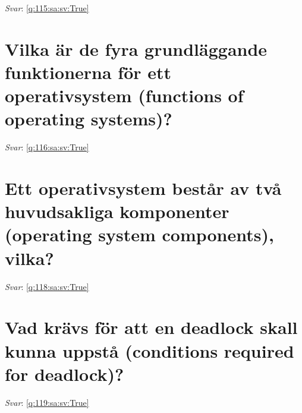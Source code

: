 \documentclass[a4paper,11pt,oneside]{book}
\begin{document}
\begin{sloppypar}
\vspace{2cm}

\noindent\makebox[\textwidth]{\hrulefill}

\vspace{1cm}

\textit{Svar}: \autoref{q:115:sa:sv:True}



\section{Vilka \"ar de fyra grundl\"aggande funktionerna f\"or ett operativsystem (functions of operating systems)?}

\label{q:116:sa:sv:False}

\vspace{2cm}

\noindent\makebox[\textwidth]{\hrulefill}

\vspace{1cm}

\textit{Svar}: \autoref{q:116:sa:sv:True}



\section{Ett operativsystem best\r{a}r av tv\r{a} huvudsakliga komponenter (operating system components), vilka?}

\label{q:118:sa:sv:False}

\vspace{2cm}

\noindent\makebox[\textwidth]{\hrulefill}

\vspace{1cm}

\textit{Svar}: \autoref{q:118:sa:sv:True}



\section{Vad kr\"avs f\"or att en deadlock skall kunna uppst\r{a} (conditions required for deadlock)?}

\label{q:119:sa:sv:False}

\vspace{2cm}

\noindent\makebox[\textwidth]{\hrulefill}

\vspace{1cm}

\textit{Svar}: \autoref{q:119:sa:sv:True}




\end{sloppypar}
\end{document}
